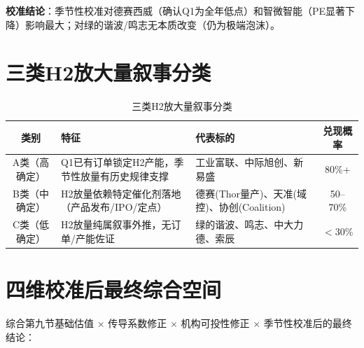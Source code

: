 \textbf{校准结论}：季节性校准对德赛西威（确认Q1为全年低点）和智微智能（PE显著下降）影响最大；对绿的谐波/鸣志无本质改变（仍为极端泡沫）。

\section{三类H2放大量叙事分类}

\begin{table}[H]
\centering\small
\renewcommand{\arraystretch}{1.2}
\begin{tabularx}{\textwidth}{c X X c}
\toprule
\textbf{类别} & \textbf{特征} & \textbf{代表标的} & \textbf{兑现概率} \\
\midrule
A类（高确定） & Q1已有订单锁定H2产能，季节性放量有历史规律支撑 & 工业富联、中际旭创、新易盛 & 80\%+ \\
B类（中确定） & H2放量依赖特定催化剂落地（产品发布/IPO/定点） & 德赛(Thor量产)、天准(域控)、协创(Coalition) & 50--70\% \\
C类（低确定） & H2放量纯属叙事外推，无订单/产能佐证 & 绿的谐波、鸣志、中大力德、索辰 & $<$30\% \\
\bottomrule
\end{tabularx}
\caption{三类H2放大量叙事分类}
\end{table}

\section{四维校准后最终综合空间}

综合第九节基础估值 $\times$ 传导系数修正 $\times$ 机构可投性修正 $\times$ 季节性校准后的最终结论：

